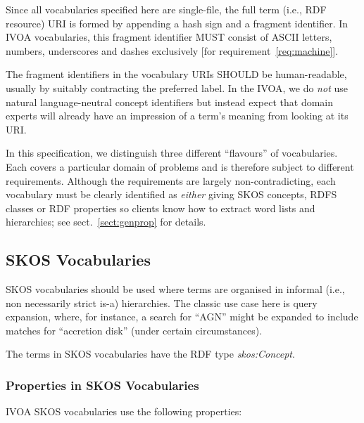 \documentclass[11pt,a4paper]{ivoa}
\newcommand{\vocterm}[1]{\emph{\color{termcolor}#1}}
\begin{document}
Since all vocabularies specified here are
single-file, the full term (i.e., RDF resource) 
URI is formed by appending a hash sign
and a fragment identifier.  In IVOA vocabularies, this fragment
identifier MUST consist of ASCII letters, numbers, underscores and
dashes exclusively [for requirement~\ref{req:machine}].

The fragment identifiers in the vocabulary URIs SHOULD be
human-readable, usually by suitably contracting the
preferred label.  In the IVOA, we do \emph{not} use natural
language-neutral concept identifiers but instead expect that domain
experts will already have an impression of a term's meaning from looking
at its URI.

In this specification, we distinguish three different ``flavours'' of
vocabularies.  Each covers a particular domain of problems and is
therefore subject to different requirements.
Although the requirements are largely non-contradicting, each vocabulary must
be clearly identified as \emph{either} giving SKOS concepts, RDFS
classes or RDF properties so clients know how to extract word lists and
hierarchies; see sect.~\ref{sect:genprop}
for details.


\subsection{SKOS Vocabularies}
\label{sect:skosvoc}

SKOS vocabularies should be used where terms are organised 
in informal (i.e., non necessarily strict is-a)
hierarchies.  The classic use case here is query expansion, where, for
instance, a search for ``AGN'' might be expanded to include matches for
``accretion disk'' (under certain circumstances).

The terms in SKOS vocabularies have the RDF type \vocterm{skos:Concept}.

\subsubsection{Properties in SKOS Vocabularies}
\label{sect:skosvoc-prop}

IVOA SKOS vocabularies use the following properties:
\end{document}
